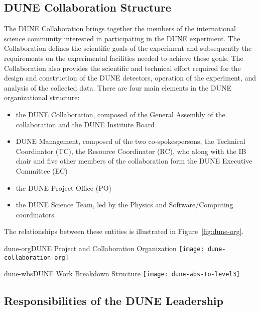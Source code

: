 \subsection{DUNE Collaboration Structure}

The DUNE Collaboration brings together the members of the international science community 
interested in participating in the DUNE experiment.  The Collaboration defines the scientific goals of the experiment and subsequently 
the requirements on the experimental facilities needed to achieve these goals.  The Collaboration also provides the scientific and 
technical effort required for the design and construction of the DUNE detectors, operation of the experiment, and analysis of the 
collected data. There are four main elements in the DUNE organizational structure:  
\begin{itemize}
\item the DUNE Collaboration, composed of the General Assembly of the collaboration and the DUNE Institute Board     
\item DUNE Management, composed of the two co-spokespersons, the Technical Coordinator (TC), the Resource Coordinator (RC), who along
  with the IB chair and five other members of the collaboration form the DUNE Executive Committee (EC)
\item the DUNE Project Office (PO)
\item the DUNE Science Team, led by the Physics and Software/Computing coordinators. 
\end{itemize}
The relationships between these entities is illustrated in Figure~\ref{fig:dune-org}.

\begin{cdrfigure}{dune-org}{DUNE Project and Collaboration Organization}
  \texttt{[image: dune-collaboration-org]}
\end{cdrfigure}

\begin{cdrfigure}{dune-wbs}{DUNE Work Breakdown Structure}
  \texttt{[image: dune-wbs-to-level3]}
\end{cdrfigure}

\subsection{Responsibilities of the DUNE Leadership}

